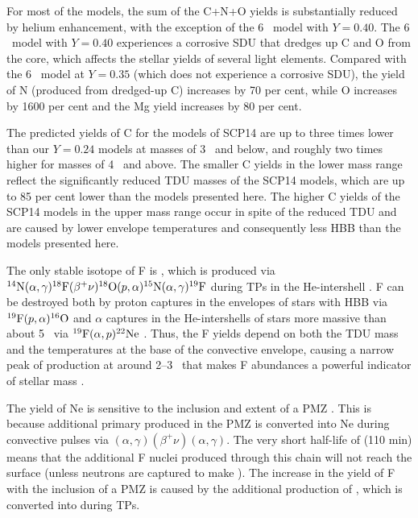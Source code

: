 For most of the models, the sum of the C+N+O yields is substantially reduced by helium enhancement, with the exception of the 6 \Msun\ model with $Y=0.40$. The 6 \Msun\ model with $Y=0.40$ experiences a corrosive SDU that dredges up C and O from the core, which affects the stellar yields of several light elements. Compared with the 6 \Msun\ model at $Y=0.35$ (which does not experience a corrosive SDU), the yield of N (produced from dredged-up C) increases by 70 per cent, while O increases by 1600 per cent and the Mg yield increases by 80 per cent.

The predicted yields of C for the models of SCP14 are up to three times lower than our $Y=0.24$ models at masses of 3 \Msun\ and below, and roughly two times higher for masses of 4 \Msun\ and above. The smaller C yields in the lower mass range reflect the significantly reduced TDU masses of the SCP14 models, which are up to 85 per cent lower than the models presented here. The higher C yields of the SCP14 models in the upper mass range occur in spite of the reduced TDU and are caused by lower envelope temperatures and consequently less HBB than the models presented here.

The only stable isotope of F is , which is produced via $\mbox{${}^{14}{\text{N}}$}(\alpha,\gamma)\mbox{${}^{18}{\text{F}}$}(\beta^+\nu)\mbox{${}^{18}{\text{O}}$}(p, \alpha)\mbox{${}^{15}{\text{N}}$}\allowbreak(\alpha, \gamma)\mbox{${}^{19}{\text{F}}$}$ during TPs in the He-intershell \citep{Jorissen:1992us}. F can be destroyed both by proton captures in the envelopes of stars with HBB via $\mbox{${}^{19}{\text{F}}$}(p,\alpha)\mbox{${}^{16}{\text{O}}$}$ and $\alpha$ captures in the He-intershells of stars more massive than about 5 \Msun\ via $\mbox{${}^{19}{\text{F}}$}(\alpha,p)\mbox{${}^{22}{\text{Ne}}$}$ \citep{Lugaro:2004en,Cristallo:2014ev}. Thus, the F yields depend on both the TDU mass and the temperatures at the base of the convective envelope, causing a narrow peak of production at around 2--3 \Msun\ that makes F abundances a powerful indicator of stellar mass \citep[e.g.,][]{DOrazi:2013dm}.

The yield of Ne is sensitive to the inclusion and extent of a PMZ \citep{Shingles:2013kg}. This is because additional primary  produced in the PMZ is converted into Ne during convective pulses via $(\alpha,\gamma)$$(\beta^+\nu)$$(\alpha,\gamma)$. The very short half-life of  (110 min) means that the additional F nuclei produced through this chain will not reach the surface (unless neutrons are captured to make ). The increase in the yield of F with the inclusion of a PMZ is caused by the additional production of , which is converted into  during TPs.

